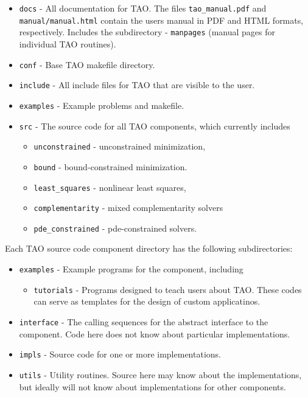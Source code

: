 \begin{itemize}
\item \texttt{docs} - All documentation for TAO. The files \texttt{tao\_manual.pdf}
                   and \texttt{manual/manual.html} contain the users manual in
                   PDF and HTML formats, respectively. Includes
                   the subdirectory
 \subitem - \texttt{manpages} (manual pages for individual TAO routines).
\item \texttt{conf} - Base TAO makefile directory.  
\item \texttt{include} - All include files for TAO that are visible to the user.
\item \texttt{examples} - Example problems and makefile.
\item \texttt{src} - The source code for all TAO components, which
                  currently includes
 \begin{itemize}
 \item \texttt{unconstrained} - unconstrained minimization,
 \item \texttt{bound} - bound-constrained minimization.
 \item \texttt{least\_squares} - nonlinear least squares,
 \item \texttt{complementarity} - mixed complementarity solvers
 \item \texttt{pde\_constrained} - pde-constrained solvers.
 \end{itemize}
\end{itemize}

\noindent
Each TAO source code component directory has the following subdirectories:
\begin{itemize}
\item  \texttt{examples} - Example programs for the component, including
  \begin{itemize}
  \item \texttt{tutorials} - Programs designed to teach users about TAO.  These
          codes can serve as templates for the design of custom applicatinos.
  \end{itemize}
\item  \texttt{interface} - The calling sequences for the abstract interface  
        to the component.
        Code here does not know about particular implementations.
\item  \texttt{impls} - Source code for one or more implementations.
\item  \texttt{utils} - Utility routines.  Source here may know about the 
          implementations, but ideally will not know about implementations
          for other components.
\end{itemize}


